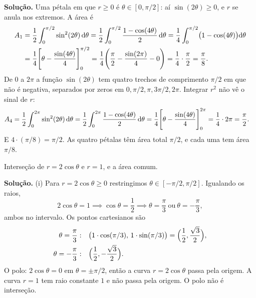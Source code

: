 \documentclass[11pt,a4paper]{article}
\begin{document}
\noindent\textbf{Solução.}
Uma pétala em que \(r\ge 0\) é \(\theta\in[0,\pi/2]\): aí \(\sin(2\theta)\ge 0\), e \(r\) se anula nos extremos. A área é
\begin{align*}
A_{1}
&=\frac12\int_{0}^{\pi/2}\sin^{2}(2\theta)\,\mathrm{d}\theta
=\frac12\int_{0}^{\pi/2}\frac{1-\cos(4\theta)}{2}\,\mathrm{d}\theta
=\frac14\int_{0}^{\pi/2}\bigl(1-\cos(4\theta)\bigr)\mathrm{d}\theta\\
&=\frac14\Biggl[\theta-\frac{\sin(4\theta)}{4}\Biggr]_{0}^{\pi/2}
=\frac14\Biggl(\frac{\pi}{2}-\frac{\sin(2\pi)}{4}-0\Biggr)
=\frac14\cdot\frac{\pi}{2}
=\frac{\pi}{8}.
\end{align*}
De \(0\) a \(2\pi\) a função \(\sin(2\theta)\) tem quatro trechos de comprimento \(\pi/2\) em que não é negativa, separados por zeros em \(0,\pi/2,\pi,3\pi/2,2\pi\). Integrar \(r^{2}\) não vê o sinal de \(r\):
\begin{align*}
A_{4}
&=\frac12\int_{0}^{2\pi}\sin^{2}(2\theta)\,\mathrm{d}\theta
=\frac12\int_{0}^{2\pi}\frac{1-\cos(4\theta)}{2}\,\mathrm{d}\theta
=\frac14\Biggl[\theta-\frac{\sin(4\theta)}{4}\Biggr]_{0}^{2\pi}
=\frac14\cdot 2\pi
=\frac{\pi}{2}.
\end{align*}
E \(4\cdot(\pi/8)=\pi/2\). As quatro pétalas têm área total \(\pi/2\), e cada uma tem área \(\pi/8\).

\begin{exercicio}[Intermediário --- I3]
Interseção de \(r=2\cos\theta\) e \(r=1\), e a área comum.
\end{exercicio}

\noindent\textbf{Solução.}
(i) Para \(r=2\cos\theta\ge 0\) restringimos \(\theta\in[-\pi/2,\pi/2]\). Igualando os raios,
\[
2\cos\theta=1\implies\cos\theta=\frac12\implies\theta=\frac{\pi}{3}\ \text{ou}\ \theta=-\frac{\pi}{3},
\]
ambos no intervalo. Os pontos cartesianos são
\begin{align*}
\theta=\frac{\pi}{3}:&\quad
\bigl(1\cdot\cos(\pi/3),\,1\cdot\sin(\pi/3)\bigr)
=\Bigl(\frac12,\frac{\sqrt{3}}{2}\Bigr),\\
\theta=-\frac{\pi}{3}:&\quad
\Bigl(\frac12,-\frac{\sqrt{3}}{2}\Bigr).
\end{align*}
O polo: \(2\cos\theta=0\) em \(\theta=\pm\pi/2\), então a curva \(r=2\cos\theta\) passa pela origem. A curva \(r=1\) tem raio constante \(1\) e não passa pela origem. O polo não é interseção.
\end{document}
